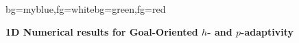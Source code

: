{

\begin{frame}[plain]
\begin{variableblock}{}{bg=myblue,fg=white}{bg=green,fg=red}
\begin{center}
\textbf{1D Numerical results for Goal-Oriented $h$- and $p$-adaptivity}
\end{center}
\end{variableblock}
\end{frame}
}
